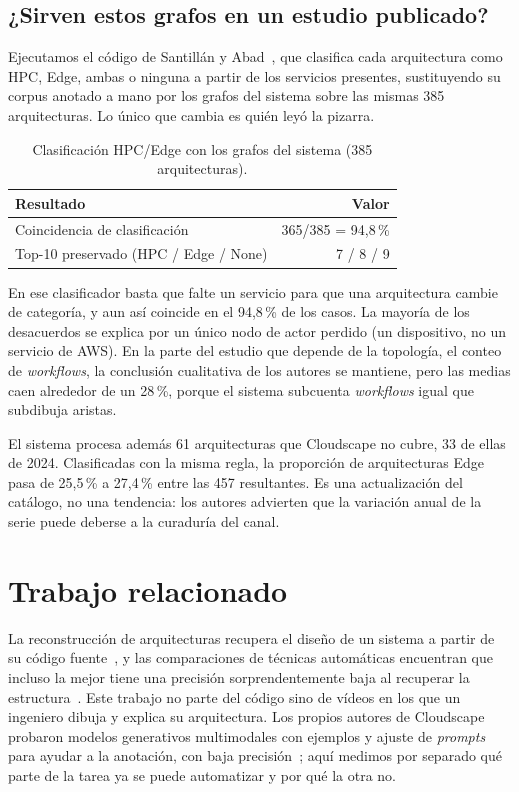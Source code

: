 \documentclass[a4paper, twocolumn, 10pt]{IEEEtran}
\begin{document}
\subsection{¿Sirven estos grafos en un estudio publicado?}
\label{sec:downstream}

Ejecutamos el código de Santillán y Abad~\cite{santillan2025hpc}, que clasifica cada
arquitectura como HPC, Edge, ambas o ninguna a partir de los servicios presentes,
sustituyendo su corpus anotado a mano por los grafos del sistema sobre las mismas
385 arquitecturas. Lo único que cambia es quién leyó la pizarra.

\begin{table}[H]
\centering\small
\caption{Clasificación HPC/Edge con los grafos del sistema (385 arquitecturas).}
\label{tab:downstream}
\begin{tabular}{lr}
\toprule
Resultado & Valor\\
\midrule
Coincidencia de clasificación     & 365/385 = 94,8\,\%\\
Top-10 preservado (HPC / Edge / None) & 7 / 8 / 9\\
\bottomrule
\end{tabular}
\end{table}

En ese clasificador basta que falte un servicio para que una arquitectura cambie de
categoría, y aun así coincide en el 94,8\,\% de los casos. La mayoría de los
desacuerdos se explica por un único nodo de actor perdido (un dispositivo, no un
servicio de AWS). En la parte del estudio que depende de la topología, el conteo de
\emph{workflows}, la conclusión cualitativa de los autores se mantiene, pero las
medias caen alrededor de un 28\,\%, porque el sistema subcuenta \emph{workflows}
igual que subdibuja aristas.

El sistema procesa además 61 arquitecturas que Cloudscape no cubre, 33 de ellas de
2024. Clasificadas con la misma regla, la proporción de arquitecturas Edge pasa de
25,5\,\% a 27,4\,\% entre las 457 resultantes. Es una actualización del catálogo, no
una tendencia: los autores advierten que la variación anual de la serie puede
deberse a la curaduría del canal.

\section{Trabajo relacionado}

La reconstrucción de arquitecturas recupera el diseño de un sistema a partir de su
código fuente~\cite{Ducasse2009SAR}, y las comparaciones de técnicas automáticas
encuentran que incluso la mejor tiene una precisión sorprendentemente baja al
recuperar la estructura~\cite{Garcia2013ComparativeSAR}. Este trabajo no parte del
código sino de vídeos en los que un ingeniero dibuja y explica su arquitectura.
Los propios autores de Cloudscape probaron modelos generativos multimodales con
ejemplos y ajuste de \emph{prompts} para ayudar a la anotación, con baja
precisión~\cite{satija2025cloudscape}; aquí medimos por separado qué parte de la
tarea ya se puede automatizar y por qué la otra no.
\end{document}
